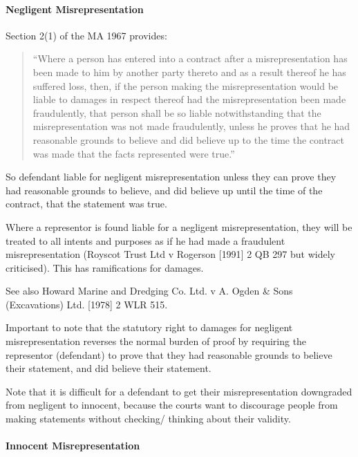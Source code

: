 \documentclass[
]{article}
\begin{document}
\hypertarget{negligent-misrepresentation}{%
\paragraph{Negligent
Misrepresentation}\label{negligent-misrepresentation}}

Section 2(1) of the MA 1967 provides:

\begin{quote}
``Where a person has entered into a contract after a misrepresentation
has been made to him by another party thereto and as a result thereof he
has suffered loss, then, if the person making the misrepresentation
would be liable to damages in respect thereof had the misrepresentation
been made fraudulently, that person shall be so liable notwithstanding
that the misrepresentation was not made fraudulently, unless he proves
that he had reasonable grounds to believe and did believe up to the time
the contract was made that the facts represented were true.''
\end{quote}

So defendant liable for negligent misrepresentation unless they can
prove they had reasonable grounds to believe, and did believe up until
the time of the contract, that the statement was true.

Where a representor is found liable for a negligent misrepresentation,
they will be treated to all intents and purposes as if he had made a
fraudulent misrepresentation (Royscot Trust Ltd v Rogerson {[}1991{]} 2
QB 297 but widely criticised). This has ramifications for damages.

See also Howard Marine and Dredging Co. Ltd. v A. Ogden \& Sons
(Excavations) Ltd. {[}1978{]} 2 WLR 515.

Important to note that the statutory right to damages for negligent
misrepresentation reverses the normal burden of proof by requiring the
representor (defendant) to prove that they had reasonable grounds to
believe their statement, and did believe their statement.

Note that it is difficult for a defendant to get their misrepresentation
downgraded from negligent to innocent, because the courts want to
discourage people from making statements without checking/ thinking
about their validity.

\hypertarget{innocent-misrepresentation}{%
\paragraph{Innocent
Misrepresentation}\label{innocent-misrepresentation}}
\end{document}
